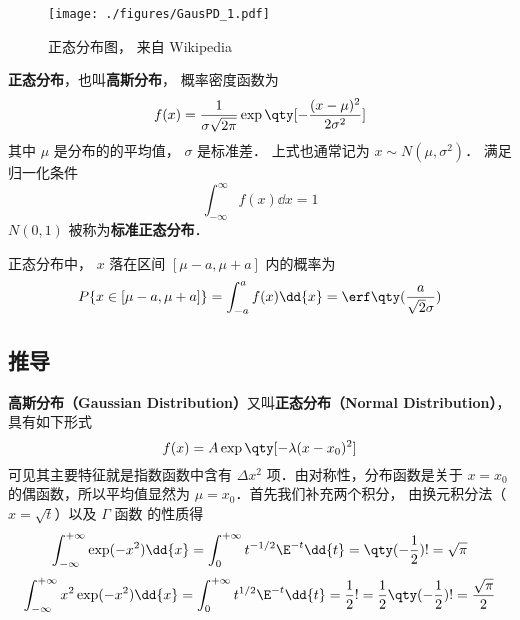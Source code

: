 
\begin{issues}
\issueTODO
\end{issues}


\begin{figure}[ht]
\centering
\texttt{[image: ./figures/GausPD\_1.pdf]}
\caption{正态分布图， 来自 Wikipedia} \label{GausPD_fig1}
\end{figure}

\textbf{正态分布}，也叫\textbf{高斯分布}， 概率密度函数为
\begin{equation}\label{GausPD_eq1}
f(x) = \frac{1}{\sigma \sqrt{2\pi }} \exp\qty[-\frac{(x - \mu )^2}{2\sigma ^2}]
\end{equation}
其中 $\mu$ 是分布的的平均值， $\sigma$ 是标准差． 上式也通常记为 $x \sim N(\mu,\sigma^2)$． 满足归一化条件
\begin{equation}
\int_{-\infty}^{\infty} f(x) \dd{x} = 1
\end{equation}
$N(0,1)$ 被称为\textbf{标准正态分布}．

正态分布中， $x$ 落在区间 $[\mu-a,\mu+a]$ 内的概率为
\begin{equation}
P\{x \in [\mu-a,\mu+a]\} = \int_{-a}^a f(x)\dd{x} = \erf\qty(\frac{a}{\sqrt{2}\sigma})
\end{equation}

\subsection{推导}
\textbf{高斯分布（Gaussian Distribution）}又叫\textbf{正态分布（Normal Distribution）}， 具有如下形式
\begin{equation}\label{GausPD_eq2}
f(x) = A\exp\qty[-\lambda (x - x_0)^2]
\end{equation}
可见其主要特征就是指数函数中含有 $\Delta x^2$ 项．由对称性，分布函数是关于 $x =x_0$ 的偶函数，所以平均值显然为 $\mu = x_0$．首先我们补充两个积分， 由换元积分法（$x=\sqrt{t}$）以及 $\Gamma$ 函数 的性质得
\begin{equation}\label{GausPD_eq3}
\int_{-\infty }^{+\infty } \exp (-x^2)\dd{x}  = \int_0^{+\infty} t^{-1/2}\E^{ - t} \dd{t}  = \qty(-\frac12)! = \sqrt \pi 
\end{equation}
\begin{equation}\label{GausPD_eq4}
\int_{-\infty}^{+\infty} x^2\exp(-x^2)\dd{x}  = \int_0^{+\infty} t^{1/2}\E^{-t} \dd{t}  = \frac12 ! = \frac12 \qty(-\frac12)! = \frac{\sqrt\pi}{2}
\end{equation}

